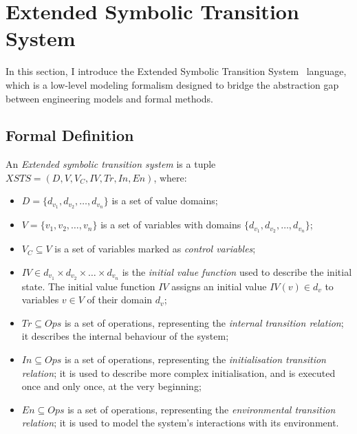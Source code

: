 \section{Extended Symbolic Transition System}\label{sec:xsts}

In this section, I introduce the Extended Symbolic Transition System~\cite{xsts} language, which is a low-level modeling formalism designed to bridge the abstraction gap between engineering models and formal methods.

\subsection{Formal Definition}

\begin{definition}
	
	An \emph{Extended symbolic transition system} is a tuple \( \mathit{XSTS} = (D, V, V_C, \mathit{IV}, \mathit{Tr}, \mathit{In}, \mathit{En}) \), where:
	
	\begin{itemize}
		\item \(D = \{ d_{v_1}, d_{v_2}, \dots, d_{v_n} \} \) is a set of value domains;
		\item \(V = \{ v_1, v_2, \dots, v_n \} \) is a set of variables with domains \( \{  d_{v_1}, d_{v_2}, \dots, d_{v_n} \} \);
		\item \(V_C \subseteq V\) is a set of variables marked as \emph{control variables};
		\item \(\mathit{IV} \in d_{v_1} \times d_{v_2} \times \dots \times d_{v_n}\) is the \emph{initial value function} used to describe the initial state. The initial value function \(\mathit{IV}\) assigns an initial value \(\mathit{IV}(v) \in d_v\) to variables \(v \in V\) of their domain \(d_v\);
		\item \(\mathit{Tr} \subseteq \mathit{Ops}\) is a set of operations, representing the \emph{internal transition relation}; it describes the internal behaviour of the system;
		\item \(\mathit{In} \subseteq \mathit{Ops}\) is a set of operations, representing the \emph{initialisation transition relation}; it is used to describe more complex initialisation, and is executed once and only once, at the very beginning;
		\item \(\mathit{En} \subseteq \mathit{Ops}\) is a set of operations, representing the \emph{environmental transition relation}; it is used to model the system's interactions with its environment.
	\end{itemize}
\end{definition}\label{def:xsts}

